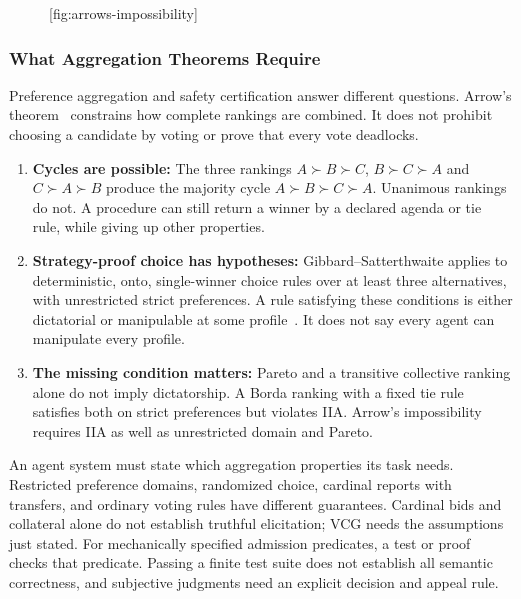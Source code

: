 \begin{figure}[tp]
  \centering
  [fig:arrows-impossibility]
\end{figure}

\subsubsection{What Aggregation Theorems Require}
\label{sec:why-arrows-matters}

Preference aggregation and safety certification answer different questions. Arrow's theorem~ constrains how complete rankings are combined. It does not prohibit choosing a candidate by voting or prove that every vote deadlocks.
\begin{enumerate}[leftmargin=1.8em,itemsep=2pt]
  \item \textbf{Cycles are possible:} The three rankings $A\succ B\succ C$, $B\succ C\succ A$ and $C\succ A\succ B$ produce the majority cycle $A\succ B\succ C\succ A$. Unanimous rankings do not. A procedure can still return a winner by a declared agenda or tie rule, while giving up other properties.
  \item \textbf{Strategy-proof choice has hypotheses:} Gibbard--Satterthwaite applies to deterministic, onto, single-winner choice rules over at least three alternatives, with unrestricted strict preferences. A rule satisfying these conditions is either dictatorial or manipulable at some profile~. It does not say every agent can manipulate every profile.
  \item \textbf{The missing condition matters:} Pareto and a transitive collective ranking alone do not imply dictatorship. A Borda ranking with a fixed tie rule satisfies both on strict preferences but violates IIA. Arrow's impossibility requires IIA as well as unrestricted domain and Pareto.
\end{enumerate}

An agent system must state which aggregation properties its task needs. Restricted preference domains, randomized choice, cardinal reports with transfers, and ordinary voting rules have different guarantees. Cardinal bids and collateral alone do not establish truthful elicitation; VCG needs the assumptions just stated. For mechanically specified admission predicates, a test or proof checks that predicate. Passing a finite test suite does not establish all semantic correctness, and subjective judgments need an explicit decision and appeal rule.

